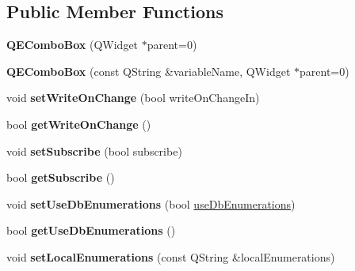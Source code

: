\subsection*{Public Member Functions}
\begin{DoxyCompactItemize}
\item 
\hypertarget{classQEComboBox_aa4119fef3c26292f4ac8cc96cfa8e967}{
{\bfseries QEComboBox} (QWidget $\ast$parent=0)}
\label{classQEComboBox_aa4119fef3c26292f4ac8cc96cfa8e967}

\item 
\hypertarget{classQEComboBox_a00d23ffd9587264a4ca8e282a985a745}{
{\bfseries QEComboBox} (const QString \&variableName, QWidget $\ast$parent=0)}
\label{classQEComboBox_a00d23ffd9587264a4ca8e282a985a745}

\item 
\hypertarget{classQEComboBox_a8850a17e23c218f9d04f72703646aa6e}{
void {\bfseries setWriteOnChange} (bool writeOnChangeIn)}
\label{classQEComboBox_a8850a17e23c218f9d04f72703646aa6e}

\item 
\hypertarget{classQEComboBox_a7d3e8427b4c1a5e7615337b884c07529}{
bool {\bfseries getWriteOnChange} ()}
\label{classQEComboBox_a7d3e8427b4c1a5e7615337b884c07529}

\item 
\hypertarget{classQEComboBox_ac3d5366dc7eb71755b8827297412fbc1}{
void {\bfseries setSubscribe} (bool subscribe)}
\label{classQEComboBox_ac3d5366dc7eb71755b8827297412fbc1}

\item 
\hypertarget{classQEComboBox_ab63a1342b03091a50d99fe07bb3910af}{
bool {\bfseries getSubscribe} ()}
\label{classQEComboBox_ab63a1342b03091a50d99fe07bb3910af}

\item 
\hypertarget{classQEComboBox_aaf4139fc9e6160d6f827a57c49314be9}{
void {\bfseries setUseDbEnumerations} (bool \hyperlink{classQEComboBox_a39bb3371e530bbf24ea08e4552e52495}{useDbEnumerations})}
\label{classQEComboBox_aaf4139fc9e6160d6f827a57c49314be9}

\item 
\hypertarget{classQEComboBox_ae2461d2b8b0224fa3be6963b473ec109}{
bool {\bfseries getUseDbEnumerations} ()}
\label{classQEComboBox_ae2461d2b8b0224fa3be6963b473ec109}

\item 
\hypertarget{classQEComboBox_a804edff05fdce2d2381cd7671f2bb613}{
void {\bfseries setLocalEnumerations} (const QString \&localEnumerations)}
\label{classQEComboBox_a804edff05fdce2d2381cd7671f2bb613}


\end{DoxyCompactItemize}
